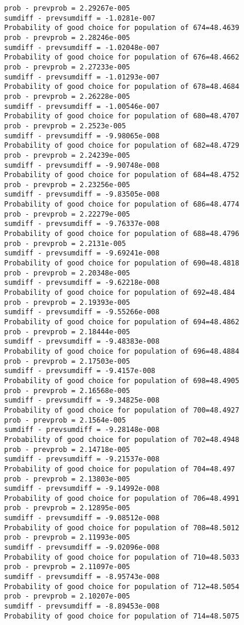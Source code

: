\documentclass[11pt,onecolumn]{article}
\begin{document}
\begin{verbatim}
prob - prevprob = 2.29267e-005
sumdiff - prevsumdiff = -1.0281e-007
Probability of good choice for population of 674=48.4639
prob - prevprob = 2.28246e-005
sumdiff - prevsumdiff = -1.02048e-007
Probability of good choice for population of 676=48.4662
prob - prevprob = 2.27233e-005
sumdiff - prevsumdiff = -1.01293e-007
Probability of good choice for population of 678=48.4684
prob - prevprob = 2.26228e-005
sumdiff - prevsumdiff = -1.00546e-007
Probability of good choice for population of 680=48.4707
prob - prevprob = 2.2523e-005
sumdiff - prevsumdiff = -9.98065e-008
Probability of good choice for population of 682=48.4729
prob - prevprob = 2.24239e-005
sumdiff - prevsumdiff = -9.90748e-008
Probability of good choice for population of 684=48.4752
prob - prevprob = 2.23256e-005
sumdiff - prevsumdiff = -9.83505e-008
Probability of good choice for population of 686=48.4774
prob - prevprob = 2.22279e-005
sumdiff - prevsumdiff = -9.76337e-008
Probability of good choice for population of 688=48.4796
prob - prevprob = 2.2131e-005
sumdiff - prevsumdiff = -9.69241e-008
Probability of good choice for population of 690=48.4818
prob - prevprob = 2.20348e-005
sumdiff - prevsumdiff = -9.62218e-008
Probability of good choice for population of 692=48.484
prob - prevprob = 2.19393e-005
sumdiff - prevsumdiff = -9.55266e-008
Probability of good choice for population of 694=48.4862
prob - prevprob = 2.18444e-005
sumdiff - prevsumdiff = -9.48383e-008
Probability of good choice for population of 696=48.4884
prob - prevprob = 2.17503e-005
sumdiff - prevsumdiff = -9.4157e-008
Probability of good choice for population of 698=48.4905
prob - prevprob = 2.16568e-005
sumdiff - prevsumdiff = -9.34825e-008
Probability of good choice for population of 700=48.4927
prob - prevprob = 2.1564e-005
sumdiff - prevsumdiff = -9.28148e-008
Probability of good choice for population of 702=48.4948
prob - prevprob = 2.14718e-005
sumdiff - prevsumdiff = -9.21537e-008
Probability of good choice for population of 704=48.497
prob - prevprob = 2.13803e-005
sumdiff - prevsumdiff = -9.14992e-008
Probability of good choice for population of 706=48.4991
prob - prevprob = 2.12895e-005
sumdiff - prevsumdiff = -9.08512e-008
Probability of good choice for population of 708=48.5012
prob - prevprob = 2.11993e-005
sumdiff - prevsumdiff = -9.02096e-008
Probability of good choice for population of 710=48.5033
prob - prevprob = 2.11097e-005
sumdiff - prevsumdiff = -8.95743e-008
Probability of good choice for population of 712=48.5054
prob - prevprob = 2.10207e-005
sumdiff - prevsumdiff = -8.89453e-008
Probability of good choice for population of 714=48.5075

\end{verbatim}
\end{document}
